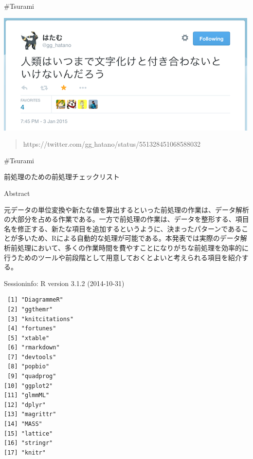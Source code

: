 \documentclass[17pt,ignorenonframetext,]{beamer}
\begin{document}
\begin{frame}{\#Tsurami}

\includegraphics{images/tsurami2.png}

\begin{quote}
\scriptsize{\faLink https://twitter.com/gg$\_$hatano/status/551328451068588032}
\end{quote}

\end{frame}

\begin{frame}{\#Tsurami}


\end{frame}

\begin{frame}{前処理のための前処理チェックリスト}

\end{frame}

\begin{frame}{Abstract}

元データの単位変換や新たな値を算出するといった前処理の作業は、データ解析の大部分を占める作業である。一方で前処理の作業は、データを整形する、項目名を修正する、新たな項目を追加するというように、決まったパターンであることが多いため、Rによる自動的な処理が可能である。本発表では実際のデータ解析前処理において、多くの作業時間を費やすことになりがちな前処理を効率的に行うためのツールや前段階として用意しておくとよいと考えられる項目を紹介する。

\end{frame}

\begin{frame}[fragile]{\small{Sessioninfo: R version 3.1.2 (2014-10-31)}}

\begin{verbatim}
 [1] "DiagrammeR"   
 [2] "ggthemr"      
 [3] "knitcitations"
 [4] "fortunes"     
 [5] "xtable"       
 [6] "rmarkdown"    
 [7] "devtools"     
 [8] "popbio"       
 [9] "quadprog"     
[10] "ggplot2"      
[11] "glmmML"       
[12] "dplyr"        
[13] "magrittr"     
[14] "MASS"         
[15] "lattice"      
[16] "stringr"      
[17] "knitr"        
\end{verbatim}

\end{frame}
\end{document}

